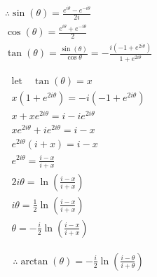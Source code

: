 \documentclass{../../style}
\begin{document}
\euler

\begin{gather*}
	\therefore \sin(\theta) = \frac{e^{i\theta} - e^{-i\theta}}{2i} \\
	\cos(\theta) = \frac{e^{i\theta} + e^{-i\theta}}{2} \\
	\tan(\theta) = \frac{\sin(\theta)}{\cos{\theta}} = -\frac{i(-1 + e^{2i\theta})}{1 + e^{2i\theta}}
\end{gather*}

\begin{gather*}
	\text{let} \quad \tan(\theta) = x \\
	x(1 + e^{2i\theta}) = -i(-1 + e^{2i\theta}) \\
	x + xe^{2i\theta} = i - ie^{2i\theta} \\
	xe^{2i\theta} + ie^{2i\theta} = i - x \\
	e^{2i\theta}(i + x) = i - x \\
	e^{2i\theta} = \frac{i - x}{i + x} \\
	2i\theta = \ln(\frac{i - x}{i + x}) \\
	i\theta = \frac{1}{2}\ln(\frac{i - x}{i + x}) \\
	\theta = -\frac{i}{2}\ln(\frac{i - x}{i + x})
\end{gather*}

\begin{gather*}
	\therefore \arctan(\theta) = -\frac{i}{2}\ln(\frac{i - \theta}{i + \theta})
\end{gather*}
\end{document}
